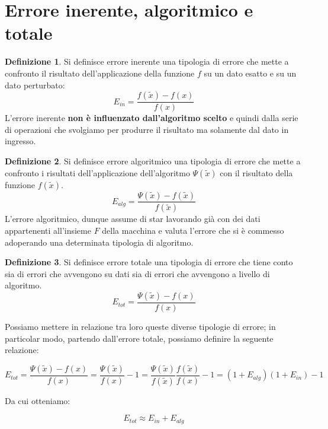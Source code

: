 \documentclass[12pt, a4paper]{book}
\theoremstyle{definition}
\newtheorem{defn}{Definizione}[section]
\begin{document}
\section{Errore inerente, algoritmico e totale}
\begin{flushleft}

\begin{defn}
Si definisce errore inerente una tipologia di errore che mette a confronto il risultato dell'applicazione della funzione $f$ su un dato esatto e su un dato perturbato:
\[
	E_{in} = \frac{f(\tilde{x}) - f(x)}{f(x)}
\] 
L'errore inerente \textbf{non è influenzato dall'algoritmo scelto} e quindi dalla serie di operazioni che svolgiamo per produrre il risultato ma solamente dal dato in ingresso.
\end{defn}

\begin{defn}
Si definisce errore algoritmico una tipologia di errore che mette a confronto i risultati dell'applicazione dell'algoritmo $\Psi(\tilde{x})$ con il risultato della funzione $f(\tilde{x})$.
\[
	E_{alg} = \frac{\Psi(\tilde{x}) - f(\tilde{x})}{f(\tilde{x})}
\] 
L'errore algoritmico, dunque assume di star lavorando già con dei dati appartenenti all'insieme $F$ della macchina e valuta l'errore che si è commesso adoperando una determinata tipologia di algoritmo. 
\end{defn}

\begin{defn}
Si definisce errore totale una tipologia di errore che tiene conto sia di errori che avvengono su dati sia di errori che avvengono a livello di algoritmo.
\[
	E_{tot} = \frac{\Psi(\tilde{x}) - f(x)}{f(x)}
\] 
\end{defn}

Possiamo mettere in relazione tra loro queste diverse tipologie di errore; in particolar modo, partendo dall'errore totale, possiamo definire la seguente relazione: 

\[
		E_{tot} = \frac{\Psi(\tilde{x}) - f(x)}{f(x)} = \frac{\Psi(\tilde{x})}{f(x)} - 1  =  \frac{\Psi(\tilde{x})}{f(\tilde{x})} \frac{f(\tilde{x})}{f(x)} - 1 = (1+E_{alg})(1+E_{in}) -1
\]

Da cui otteniamo: 

\[
		E_{tot} \approx E_{in} +  E_{alg}
\]


\end{flushleft}
\end{document}
